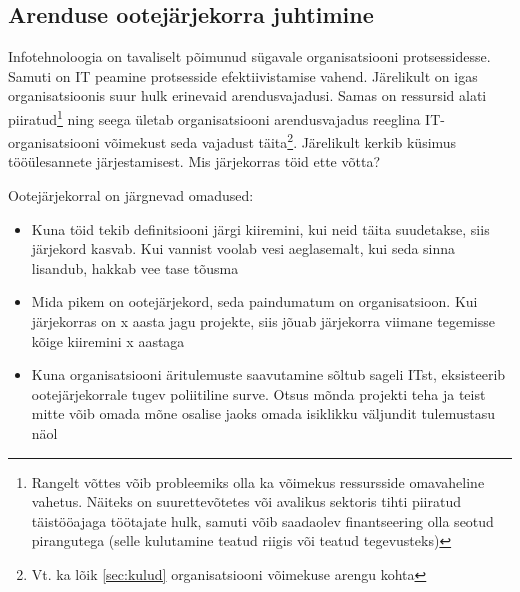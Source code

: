 \documentclass{tufte-book}
\begin{document}
\subsection{Arenduse ootejärjekorra juhtimine}
Infotehnoloogia on tavaliselt põimunud sügavale organisatsiooni protsessidesse. Samuti on IT peamine protsesside efektiivistamise vahend. Järelikult on igas organisatsioonis suur hulk erinevaid arendusvajadusi. Samas on ressursid alati piiratud\footnote{Rangelt võttes võib probleemiks olla ka võimekus ressursside omavaheline vahetus. Näiteks on suurettevõtetes või avalikus sektoris tihti piiratud täistööajaga töötajate hulk, samuti võib saadaolev finantseering olla seotud pirangutega (selle kulutamine teatud riigis või teatud tegevusteks)} ning seega ületab organisatsiooni arendusvajadus reeglina IT-organisatsiooni võimekust seda vajadust täita\footnote{Vt. ka lõik \ref{sec:kulud} organisatsiooni võimekuse arengu kohta}. Järelikult kerkib küsimus tööülesannete järjestamisest. Mis järjekorras töid ette võtta?

Ootejärjekorral on järgnevad omadused:
\begin{itemize}
	\item Kuna töid tekib definitsiooni järgi kiiremini, kui neid täita suudetakse, siis järjekord kasvab. Kui vannist voolab vesi aeglasemalt, kui seda sinna lisandub, hakkab vee tase tõusma
	\item Mida pikem on ootejärjekord, seda paindumatum on organisatsioon. Kui järjekorras on x aasta jagu projekte, siis jõuab järjekorra viimane tegemisse kõige kiiremini x aastaga
	\item Kuna organisatsiooni äritulemuste saavutamine sõltub sageli ITst, eksisteerib ootejärjekorrale tugev poliitiline surve. Otsus mõnda projekti teha ja teist mitte võib omada mõne osalise jaoks omada isiklikku väljundit tulemustasu näol
\end{itemize}
\end{document}
